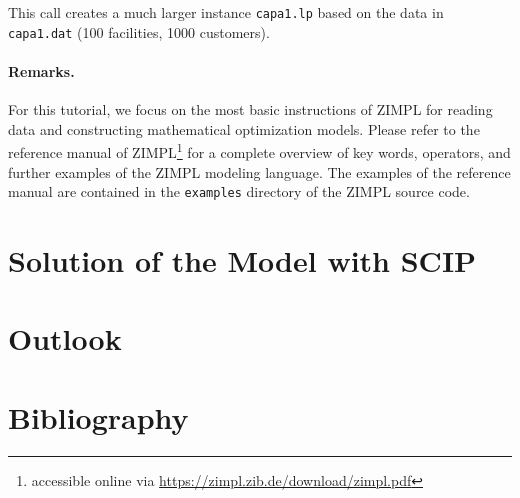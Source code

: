 \documentclass[a4paper,10pt]{article}
\begin{document}
This call creates a much larger instance \texttt{capa1.lp} based on the data in \texttt{capa1.dat} (100 facilities, 1000 customers).


\paragraph{Remarks.}

For this tutorial, we focus on the most basic instructions of ZIMPL for reading data and constructing mathematical optimization models.
Please refer to the reference manual of ZIMPL\footnote{accessible online via \url{https://zimpl.zib.de/download/zimpl.pdf}} for a complete overview of key words, operators, and further examples of the ZIMPL modeling language.
The examples of the reference manual are contained in the \texttt{examples} directory of the ZIMPL source code.


\section{Solution of the Model with SCIP}


\section{Outlook}


\cite{*}

\section*{Bibliography}



\end{document}
